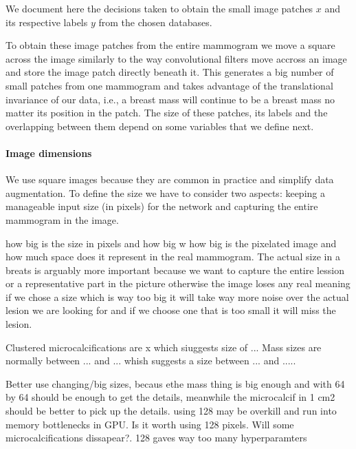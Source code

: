 We document here the decisions taken to obtain the small image patches $x$ and its respective labels $y$ from the chosen databases.

To obtain these image patches from the entire mammogram we move a square across the image similarly to the way convolutional filters move accross an image and store the image patch directly beneath it. This generates a big number of small patches from one mammogram and takes advantage of the translational invariance of our data, i.e., a breast mass will continue to be a breast mass no matter its position in the patch. The size of these patches, its labels and the overlapping between them depend on some variables that we define next.


\paragraph{Image dimensions}
	We use square images because they are common in practice and simplify data augmentation. To define the size we have to consider two aspects: keeping a manageable input size (in pixels) for the network and capturing the entire mammogram in the image. 
 
how big is the size in pixels and how big w  how big is the pixelated image and how much space does it represent in the real mammogram. The actual size in a breats is arguably more important because we want to capture the entire lession or a representative part in the picture otherwise the image loses any real meaning 
if we chose a size which is way too big it will take way more noise over the actual lesion we are looking for and if we choose one that is too small it will miss the lesion. 

Clustered microcalcifications are x which siuggests size of ...
Mass sizes are normally between ... and ... \cite{somebody} whish suggests a size between ... and ..... 

Better use changing/big sizes, becaus ethe mass thing is big enough and with 64 by 64 should be enough to get the details, meanwhile the microcalcif in 1 cm2 should be better to pick up the details.
using 128 may be overkill and run into memory bottlenecks in GPU. Is it worth using 128 pixels. Will some microcalcifications dissapear?. 128 gaves way too many hyperparamters

